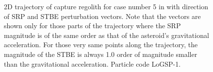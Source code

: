 \begin{figure}[htb]
\centering
\captionsetup{justification=centering}
\caption{2D trajectory of capture regolith for case number 5 in  with direction of \gls{SRP} and \gls{STBE} perturbation vectors. Note that the vectors are shown only for those parts of the trajectory where the \gls{SRP} magnitude is of the same order as that of the asteroid's gravitational acceleration. For those very same points along the trajectory, the magnitude of the \gls{STBE} is always 1.0 order of magnitude smaller than the gravitational acceleration. Particle code LoGSP-1.}
\label{fig:LoGSP_1_capture_case_5_2d_trajectory_srp_stbe_perturbationVectors}
\end{figure}
\FloatBarrier
